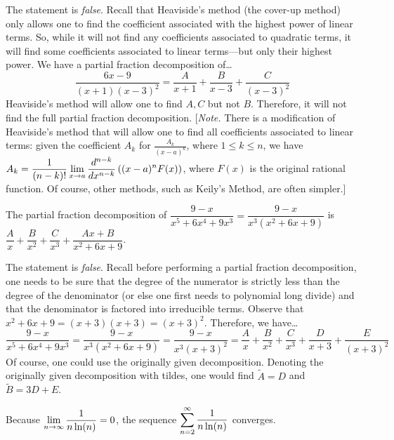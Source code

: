 \documentclass[11pt,letterpaper]{article}
\begin{document}
\sol The statement is \textit{false}. Recall that Heaviside's method (the cover-up method) only allows one to find the coefficient associated with the highest power of linear terms. So, while it will not find any coefficients associated to quadratic terms, it will find some coefficients associated to linear terms---but only their highest power. We have a partial fraction decomposition of\dots
	\[
	\dfrac{6x - 9}{(x + 1)(x - 3)^2}= \dfrac{A}{x + 1} + \dfrac{B}{x - 3} + \dfrac{C}{(x - 3)^2}
	\]
Heaviside's method will allow one to find $A, C$ but not $B$. Therefore, it will not find the full partial fraction decomposition. [\textit{Note.} There is a modification of Heaviside's method that will allow one to find all coefficients associated to linear terms: given the coefficient $A_k$ for $\frac{A_k}{(x - a)^k}$, where $1 \leq k \leq n$, we have $\displaystyle A_k= \frac{1}{(n - k)!} \lim_{x \to a} \frac{d^{n-k}}{dx^{n-k}} \left( (x - a)^n F(x) \right)$, where $F(x)$ is the original rational function. Of course, other methods, such as Keily's Method, are often simpler.] \pvspace{1.3cm}



\newpage



The partial fraction decomposition of $\dfrac{9 - x}{x^5 + 6x^4 + 9x^3}= \dfrac{9 - x}{x^3(x^2 + 6x + 9)}$ is $\dfrac{A}{x} + \dfrac{B}{x^2} + \dfrac{C}{x^3} + \dfrac{Ax + B}{x^2 + 6x + 9}$. \pspace

\sol The statement is \textit{false}. Recall before performing a partial fraction decomposition, one needs to be sure that the degree of the numerator is strictly less than the degree of the denominator (or else one first needs to polynomial long divide) and that the denominator is factored into irreducible terms. Observe that $x^2 + 6x + 9= (x + 3)(x + 3)= (x + 3)^2$. Therefore, we have\dots
	\[
	\dfrac{9 - x}{x^5 + 6x^4 + 9x^3}= \dfrac{9 - x}{x^3(x^2 + 6x + 9)}= \dfrac{9 - x}{x^3(x + 3)^2}= \dfrac{A}{x} + \dfrac{B}{x^2} + \dfrac{C}{x^3} + \dfrac{D}{x + 3} + \dfrac{E}{(x + 3)^2}
	\]
Of course, one could use the originally given decomposition. Denoting the originally given decomposition with tildes, one would find $\tilde{A}= D$ and $\tilde{B}= 3D + E$. \pvspace{1.3cm}



 Because $\displaystyle\lim_{n \to \infty} \dfrac{1}{n \ln(n)}= 0$, the sequence $\displaystyle\sum_{n=2}^\infty \dfrac{1}{n \ln(n)}$ converges. \pspace
\end{document}

